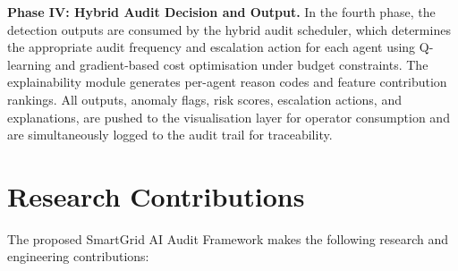 \par \vspace{0.35cm}
\textbf{Phase IV: Hybrid Audit Decision and Output.} In the fourth phase, the detection outputs are consumed by the hybrid audit scheduler, which determines the appropriate audit frequency and escalation action for each agent using Q-learning and gradient-based cost optimisation under budget constraints. The explainability module generates per-agent reason codes and feature contribution rankings. All outputs, anomaly flags, risk scores, escalation actions, and explanations, are pushed to the visualisation layer for operator consumption and are simultaneously logged to the audit trail for traceability.

\section{Research Contributions}

The proposed SmartGrid AI Audit Framework makes the following research and engineering contributions:

